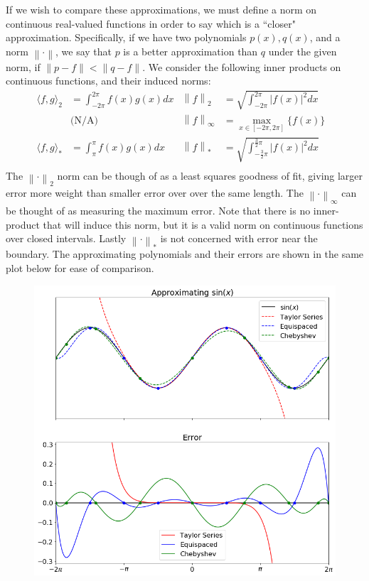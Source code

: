 \documentclass[12pt]{article}
\newcommand{\norm}[1]{\left\lVert#1\right\rVert}
\begin{document}
If we wish to compare these approximations, we must define a norm on continuous real-valued functions in order to say which is a ``closer" approximation. Specifically, if we have two polynomials $p(x), q(x)$, and a norm $\norm{\cdot}$,  we say that $p$ is a better approximation than $q$ under the given norm, if $\norm{p - f} < \norm{q - f}$. We consider the following inner products on continuous functions, and their induced norms:
\begin{align*}
	\langle f, g \rangle_2 & = \int_{-2\pi}^{2\pi} f(x)g(x) dx & \norm{f}_2 &= \sqrt{\int_{-2\pi}^{2\pi} \vert f(x) \vert^2 dx} & \tag{Euclidian Norm} \\
	 &  \text{(N/A)} & \norm{f}_\infty &= \max_{x \in [-2\pi, 2\pi]}\{f(x)\} & \tag{Max Norm} \\
	\langle f, g \rangle_* & = \int_{\pi}^{\pi} f(x)g(x) dx & \norm{f}_* &= \sqrt{\int_{-\frac{3}{2}\pi}^{\frac{3}{2}\pi} \vert f(x) \vert^2 dx} & \tag{Interior Norm} \\
\end{align*}
The $\norm{\cdot}_2$ norm can be though of as a least squares goodness of fit, giving larger error more weight than smaller error over over the same length. The $\norm{\cdot}_\infty$ can be thought of as measuring the maximum error. Note that there is no inner-product that will induce this norm, but it is a valid norm on continuous functions over closed intervals. Lastly $\norm{\cdot}_*$ is not concerned with error near the boundary. The approximating polynomials and their errors are shown in the same plot below for ease of comparison.

\begin{figure}[H]
	\includegraphics[width=1\textwidth]{approx}
	\centering
\end{figure}
\end{document}
